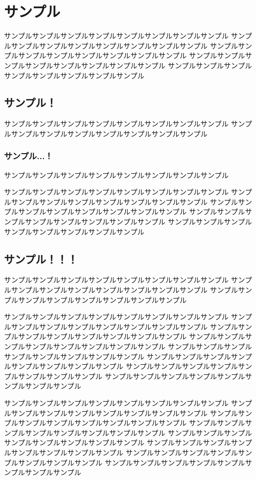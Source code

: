 


\section{サンプル}
サンプルサンプルサンプルサンプルサンプルサンプルサンプルサンプル
サンプルサンプルサンプルサンプルサンプルサンプルサンプルサンプル
サンプルサンプルサンプルサンプルサンプルサンプルサンプルサンプル
サンプルサンプルサンプルサンプルサンプルサンプルサンプルサンプル
サンプルサンプルサンプルサンプルサンプルサンプルサンプルサンプル
\subsection{サンプル！}
サンプルサンプルサンプルサンプルサンプルサンプルサンプルサンプル
サンプルサンプルサンプルサンプルサンプルサンプルサンプルサンプル
\subsubsection{サンプル...！}
サンプルサンプルサンプルサンプルサンプルサンプルサンプルサンプル


サンプルサンプルサンプルサンプルサンプルサンプルサンプルサンプル
サンプルサンプルサンプルサンプルサンプルサンプルサンプルサンプル
サンプルサンプルサンプルサンプルサンプルサンプルサンプルサンプル
サンプルサンプルサンプルサンプルサンプルサンプルサンプルサンプル
サンプルサンプルサンプルサンプルサンプルサンプルサンプルサンプル
\subsection{サンプル！！！}
サンプルサンプルサンプルサンプルサンプルサンプルサンプルサンプル
サンプルサンプルサンプルサンプルサンプルサンプルサンプルサンプル
サンプルサンプルサンプルサンプルサンプルサンプルサンプルサンプル


サンプルサンプルサンプルサンプルサンプルサンプルサンプルサンプル
サンプルサンプルサンプルサンプルサンプルサンプルサンプルサンプル
サンプルサンプルサンプルサンプルサンプルサンプルサンプルサンプル
サンプルサンプルサンプルサンプルサンプルサンプルサンプルサンプル
サンプルサンプルサンプルサンプルサンプルサンプルサンプルサンプル
サンプルサンプルサンプルサンプルサンプルサンプルサンプルサンプル
サンプルサンプルサンプルサンプルサンプルサンプルサンプルサンプル
サンプルサンプルサンプルサンプルサンプルサンプルサンプルサンプル


サンプルサンプルサンプルサンプルサンプルサンプルサンプルサンプル
サンプルサンプルサンプルサンプルサンプルサンプルサンプルサンプル
サンプルサンプルサンプルサンプルサンプルサンプルサンプルサンプル
サンプルサンプルサンプルサンプルサンプルサンプルサンプルサンプル
サンプルサンプルサンプルサンプルサンプルサンプルサンプルサンプル
サンプルサンプルサンプルサンプルサンプルサンプルサンプルサンプル
サンプルサンプルサンプルサンプルサンプルサンプルサンプルサンプル
サンプルサンプルサンプルサンプルサンプルサンプルサンプルサンプル

